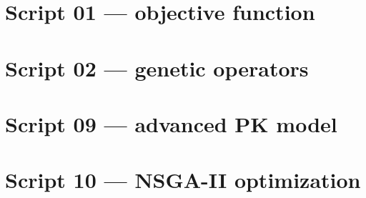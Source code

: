 \section{Script 01 --- objective function}


\section{Script 02 --- genetic operators}


\section{Script 09 --- advanced PK model}


\section{Script 10 --- NSGA-II optimization}

